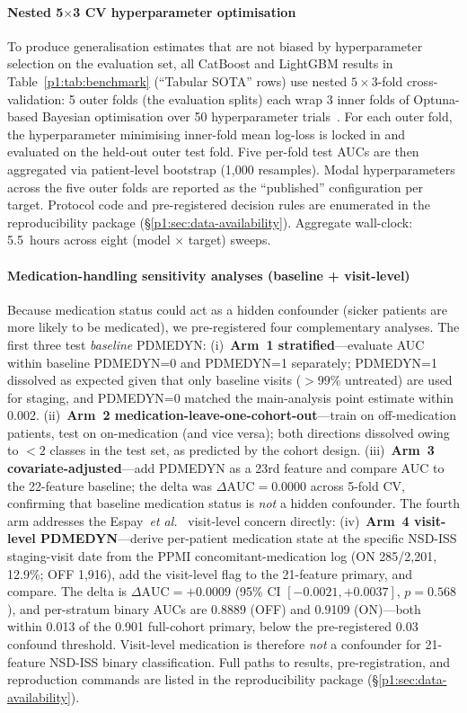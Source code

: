 \paragraph*{Nested 5$\times$3 CV hyperparameter optimisation} To produce generalisation estimates that are not biased by hyperparameter selection on the evaluation set, all CatBoost and LightGBM results in Table~\ref{p1:tab:benchmark} (``Tabular SOTA'' rows) use nested $5 \times 3$-fold cross-validation: 5 outer folds (the evaluation splits) each wrap 3 inner folds of Optuna-based Bayesian optimisation over 50 hyperparameter trials~\cite{cawleytalbot2010}. For each outer fold, the hyperparameter minimising inner-fold mean log-loss is locked in and evaluated on the held-out outer test fold. Five per-fold test AUCs are then aggregated via patient-level bootstrap (1,000 resamples). Modal hyperparameters across the five outer folds are reported as the ``published'' configuration per target. Protocol code and pre-registered decision rules are enumerated in the reproducibility package (\S\ref{p1:sec:data-availability}). Aggregate wall-clock: 5.5~hours across eight (model $\times$ target) sweeps.

\paragraph*{Medication-handling sensitivity analyses (baseline + visit-level)} Because medication status could act as a hidden confounder (sicker patients are more likely to be medicated), we pre-registered four complementary analyses. The first three test \emph{baseline} PDMEDYN: (i)~\textbf{Arm~1 stratified}---evaluate AUC within baseline PDMEDYN=0 and PDMEDYN=1 separately; PDMEDYN=1 dissolved as expected given that only baseline visits ($>99\%$ untreated) are used for staging, and PDMEDYN=0 matched the main-analysis point estimate within 0.002. (ii)~\textbf{Arm~2 medication-leave-one-cohort-out}---train on off-medication patients, test on on-medication (and vice versa); both directions dissolved owing to $<2$ classes in the test set, as predicted by the cohort design. (iii)~\textbf{Arm~3 covariate-adjusted}---add PDMEDYN as a 23rd feature and compare AUC to the 22-feature baseline; the delta was $\Delta\mathrm{AUC} = 0.0000$ across 5-fold CV, confirming that baseline medication status is \emph{not} a hidden confounder. The fourth arm addresses the Espay~\emph{et al.}~\cite{espay2025med} visit-level concern directly: (iv)~\textbf{Arm~4 visit-level PDMEDYN}---derive per-patient medication state at the specific NSD-ISS staging-visit date from the PPMI concomitant-medication log (ON 285/2{,}201, 12.9\%; OFF 1{,}916), add the visit-level flag to the 21-feature primary, and compare. The delta is $\Delta\mathrm{AUC}{=}+0.0009$ (95\% CI $[-0.0021, +0.0037]$, $p{=}0.568$), and per-stratum binary AUCs are 0.8889 (OFF) and 0.9109 (ON)---both within 0.013 of the 0.901 full-cohort primary, below the pre-registered 0.03 confound threshold. Visit-level medication is therefore \emph{not} a confounder for 21-feature NSD-ISS binary classification. Full paths to results, pre-registration, and reproduction commands are listed in the reproducibility package (\S\ref{p1:sec:data-availability}).

